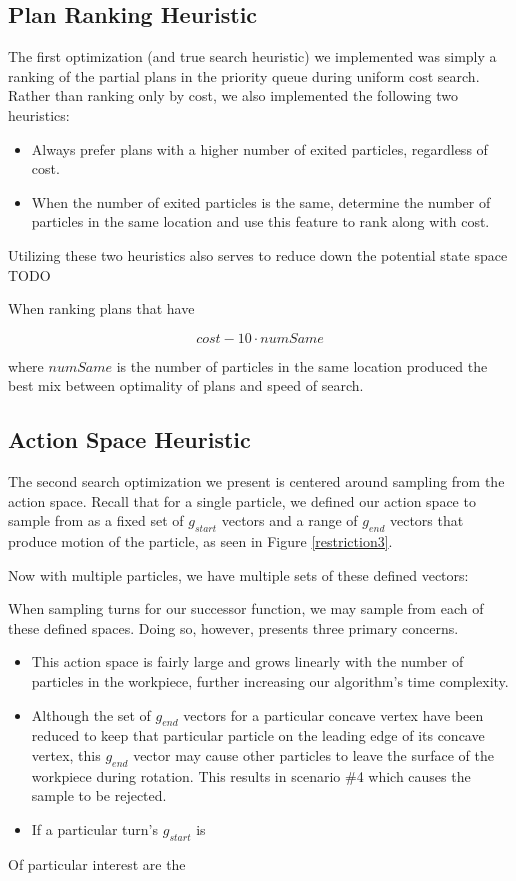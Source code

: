 \subsection{Plan Ranking Heuristic}

The first optimization (and true search heuristic) we implemented was simply a ranking of the partial plans in the priority queue during uniform cost search. Rather than ranking only by cost, we also implemented the following two heuristics:

\begin{itemize}
\item Always prefer plans with a higher number of exited particles, regardless of cost.
\item When the number of exited particles is the same, determine the number of particles in the same location and use this feature to rank along with cost.
\end{itemize}

Utilizing these two heuristics also serves to reduce down the potential state space TODO


When ranking plans that have

$$
cost - 10 \cdot numSame
$$

where $numSame$ is the number of particles in the same location produced the best mix between optimality of plans and speed of search.

\subsection{Action Space Heuristic}

The second search optimization we present is centered around sampling from the action space. Recall that for a single particle, we defined our action space to sample from as a fixed set of $g_{start}$ vectors and a range of $g_{end}$ vectors that produce motion of the particle, as seen in Figure \ref{restriction3}.

Now with multiple particles, we have multiple sets of these defined vectors:


When sampling turns for our successor function, we may sample from each of these defined spaces. Doing so, however, presents three primary concerns.

\begin{itemize}
\item This action space is fairly large and grows linearly with the number of particles in the workpiece, further increasing our algorithm's time complexity.
\item Although the set of $g_{end}$ vectors for a particular concave vertex have been reduced to keep that particular particle on the leading edge of its concave vertex, this $g_{end}$ vector may cause other particles to leave the surface of the workpiece during rotation. This results in scenario \#4 which causes the sample to be rejected.
\item If a particular turn's $g_{start}$ is
\end{itemize}

Of particular interest are the

